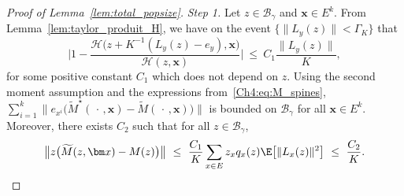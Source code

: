 \begin{refsegment}
\begin{proof}[Proof of Lemma~\ref{lem:total_popsize}]
\medskip\noindent
\emph{Step 1.}
Let $z \in \mathscr{B}_{\gamma}$ and $\bm x
\in E^k$.
From Lemma~\ref{lem:taylor_produit_H}, we have on the event $\{\lVert {L}_y(z)\rVert <\Gamma_K\}$ that  
\begin{equation*}
\Big|1- \frac{\mathcal{H}\big(z+ K^{-1}(L_y(z)-e_y),\bm x\big)}{\mathcal{H}(z,\bm x)}\Big|\ \leq\  C_1\frac{\lVert {L}_y(z)\rVert}{K},
\end{equation*}
for some positive constant $C_1$ which does not depend on $z$.
Using the second moment assumption and the expressions from~\eqref{Ch4:eq:M_spines}, $\sum_{i=1}^k\big\lVert e_{x^i}\big(\widetilde M^\star(\,\cdot\, , \bm x)-\widetilde M(\,\cdot\, , \bm x)\big)\big\rVert$ is bounded on $\mathscr{B}_{\gamma}$ for all $\bm x \in E^k$. Moreover, there exists $C_2$ such that for all $z\in\mathscr{B}_{\gamma}$,  
\begin{equation}\label{Ch4:eq:control_Lh-L_totalpop}
\big\lVert z \big(\widetilde M(z,\bm x)- M(z)\big)\big\rVert \ \leq\ \frac{C_1}{K} \sum_{x\in E} z_x  q_x(z) \E\big[\lVert L_x(z)\lVert^2 \big]\ \leq\ \frac{C_2}{K}.
\end{equation}


\end{proof}
\end{refsegment}
